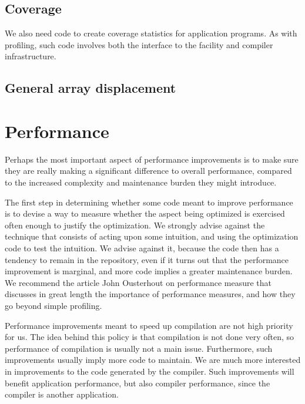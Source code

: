 \subsection{Coverage}

We also need code to create coverage statistics for application
programs.  As with profiling, such code involves both the interface to
the facility and compiler infrastructure.

\subsection{General array displacement}

\section{Performance}

Perhaps the most important aspect of performance improvements is to
make sure they are really making a significant difference to overall
performance, compared to the increased complexity and maintenance
burden they might introduce.

The first step in determining whether some code meant to improve
performance is to devise a way to measure whether the aspect being
optimized is exercised often enough to justify the optimization.  We
strongly advise against the technique that consists of acting upon
some intuition, and using the optimization code to test the
intuition.  We advise against it, because the code then has a tendency
to remain in the repository, even if it turns out that the performance
improvement is marginal, and more code implies a greater maintenance
burden.  We recommend the article \cite{10.1145/3213770}
John Ousterhout on performance measure that discusses in great length
the importance of performance measures, and how they go beyond simple
profiling.

Performance improvements meant to speed up compilation are not high
priority for us.  The idea behind this policy is that compilation is
not done very often, so performance of compilation is usually not a
main issue.  Furthermore, such improvements usually imply more code to
maintain.  We are much more interested in improvements to the code
generated by the compiler.  Such improvements will benefit application
performance, but also compiler performance, since the compiler is
another application.
